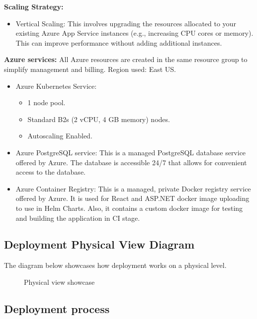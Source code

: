 \documentclass[
    english, %
]{VUMIFPSkursinis}
\begin{document}
\textbf{Scaling Strategy:}
\begin{itemize}
    \item Vertical Scaling: This involves upgrading the resources allocated to your existing Azure App Service instances (e.g., increasing CPU cores or memory). This can improve performance without adding additional instances.
\end{itemize}

\textbf{Azure services:}
All Azure resources are created in the same resource group to simplify management and billing. Region used: East US.
\begin{itemize}
    \item Azure Kubernetes Service:
        \begin{itemize}
            \item 1 node pool.
            \item Standard B2s (2 vCPU, 4 GB memory) nodes.
            \item Autoscaling Enabled.
        \end{itemize}
    \item Azure PostgreSQL service: This is a managed PostgreSQL database service offered by Azure. The database is accessible 24/7 that allows for convenient access to the database.
    \item Azure Container Registry: This is a managed, private Docker registry service offered by Azure. It is used for React and ASP.NET docker image uploading to use in Helm Charts. Also, it contains a custom docker image for testing and building the application in CI stage.
\end{itemize}

\subsection{Deployment Physical View Diagram}

The diagram below showcases how deployment works on a physical level.

\begin{figure}[ht]
    \centering
    
    \label{physical-view-showcase}
    \caption{Physical view showcase}
\end{figure}

\subsection{Deployment process}
\end{document}
